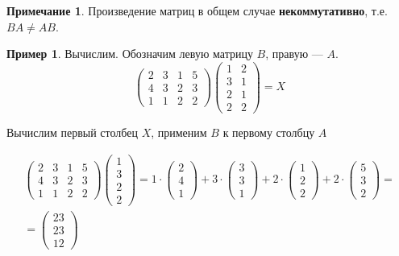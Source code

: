 \documentclass[]{article}
\theoremstyle{theorem}
\theoremstyle{definition}
\newtheorem{ex}{Пример}
\newtheorem*{nt}{Примечание}
\begin{document}
\begin{nt}
	Произведение матриц в общем случае \textbf{некоммутативно}, т.е. $BA\not=AB$.
\end{nt}

\begin{ex}
	Вычислим. Обозначим левую матрицу $B$, правую --- $A.$ 
	\begin{equation*}
\begin{pmatrix}
	2&3&1&5\\
	4&3&2&3\\
	1&1&2&2
\end{pmatrix}
\begin{pmatrix}
	1&2\\
	3&1\\
	2&1\\
	2&2
\end{pmatrix}
=
X
	\end{equation*}
	
Вычислим первый столбец $X$, применим $B$ к первому столбцу $A$

\begin{equation*}
\begin{gathered}
		\begin{pmatrix}
		2&3&1&5\\
		4&3&2&3\\
		1&1&2&2
	\end{pmatrix}
	\begin{pmatrix}
		1\\
		3\\
		2\\
		2
	\end{pmatrix}
	=
	1
	\cdot
	\begin{pmatrix}
		2\\
		4\\
		1
	\end{pmatrix}
	+
	3
	\cdot
\begin{pmatrix}
	3\\
	3\\
	1
\end{pmatrix}
+
	2
	\cdot
\begin{pmatrix}
	1\\
	2\\
	2
\end{pmatrix}
+
	2
	\cdot
\begin{pmatrix}
	5\\
	3\\
	2
\end{pmatrix}
=
\\
=
\begin{pmatrix}
	23\\
	23\\
	12
\end{pmatrix}
\end{gathered}
\end{equation*}


\end{ex}
\end{document}
